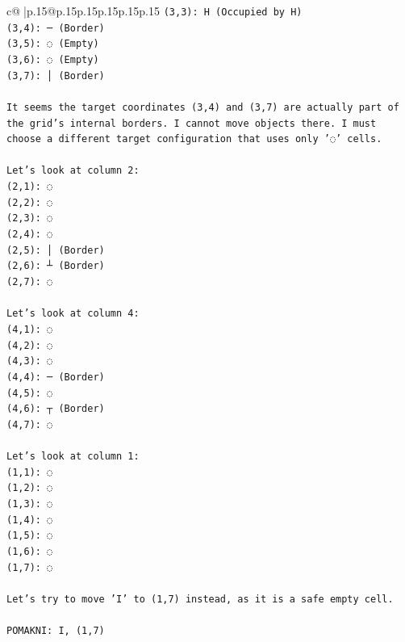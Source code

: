 \documentclass{article}
\begin{document}
{\begin{supertabular}{c@{$\;$}|p{.15\linewidth}@{}p{.15\linewidth}p{.15\linewidth}p{.15\linewidth}p{.15\linewidth}p{.15\linewidth}}
{{{\texttt{(3,3): H (Occupied by H)} \\
\texttt{(3,4): ─ (Border)} \\
\texttt{(3,5): ◌ (Empty)} \\
\texttt{(3,6): ◌ (Empty)} \\
\texttt{(3,7): │ (Border)} \\
\\ 
\texttt{It seems the target coordinates (3,4) and (3,7) are actually part of the grid's internal borders. I cannot move objects there. I must choose a different target configuration that uses only '◌' cells.} \\
\\ 
\texttt{Let's look at column 2:} \\
\texttt{(2,1): ◌} \\
\texttt{(2,2): ◌} \\
\texttt{(2,3): ◌} \\
\texttt{(2,4): ◌} \\
\texttt{(2,5): │ (Border)} \\
\texttt{(2,6): ┴ (Border)} \\
\texttt{(2,7): ◌} \\
\\ 
\texttt{Let's look at column 4:} \\
\texttt{(4,1): ◌} \\
\texttt{(4,2): ◌} \\
\texttt{(4,3): ◌} \\
\texttt{(4,4): ─ (Border)} \\
\texttt{(4,5): ◌} \\
\texttt{(4,6): ┬ (Border)} \\
\texttt{(4,7): ◌} \\
\\ 
\texttt{Let's look at column 1:} \\
\texttt{(1,1): ◌} \\
\texttt{(1,2): ◌} \\
\texttt{(1,3): ◌} \\
\texttt{(1,4): ◌} \\
\texttt{(1,5): ◌} \\
\texttt{(1,6): ◌} \\
\texttt{(1,7): ◌} \\
\\ 
\texttt{Let's try to move 'I' to (1,7) instead, as it is a safe empty cell.} \\
\\ 
\texttt{POMAKNI: I, (1,7)} \\
            }
        }
    }
     \\ \\


\end{supertabular}}
\end{document}
